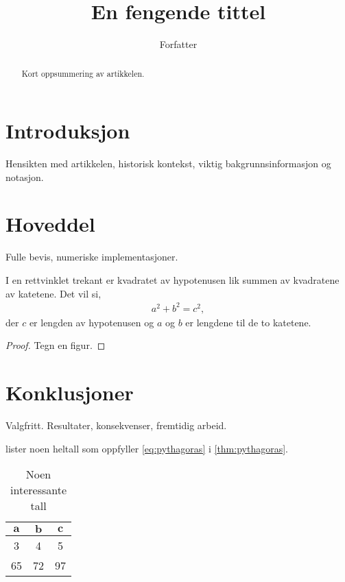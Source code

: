 \documentclass[a4paper, article, oneside, norsk]{memoir} %
\title{En fengende tittel}
\author{Forfatter}
\newcommand{\0}{\mathbf{0}}
\newcommand{\1}{\mathbf{1}}
\begin{document}
\maketitle


\begin{abstract}
    \noindent
    Kort oppsummering av artikkelen.
\end{abstract}


\chapter{Introduksjon}


Hensikten med artikkelen, historisk kontekst, viktig bakgrunnsinformasjon og notasjon.


\chapter{Hoveddel}


Fulle bevis, numeriske implementasjoner.

\begin{teorem}[Pythagoras]
    \label{thm:pythagoras}
    I en rettvinklet trekant er kvadratet av hypotenusen lik summen av kvadratene av katetene. Det vil si,
    \begin{align}
        \label{eq:pythagoras}
            a^2 + b^2 = c^2,
    \end{align}
    der \(c\) er lengden av hypotenusen og \(a\) og \(b\) er lengdene til de to katetene.
\end{teorem}

\begin{proof}
    Tegn en figur.
\end{proof}


\chapter{Konklusjoner}


Valgfritt. Resultater, konsekvenser, fremtidig arbeid.

 lister noen heltall som oppfyller \cref{eq:pythagoras} i \cref{thm:pythagoras}.

\begin{table}[htbp]
    \centering
    \begin{tabular}{@{}ccc@{}}
        \toprule
        \(\boldsymbol{a}\) & \(\boldsymbol{b}\) & \(\boldsymbol{c}\)
        \\
        \midrule
        3 & 4 & 5
        \\
        65 & 72 & 97
        \\
        \bottomrule
    \end{tabular}
    \caption{Noen interessante tall}
    \label{tab:tall}
\end{table}


\printbibliography
\end{document}
